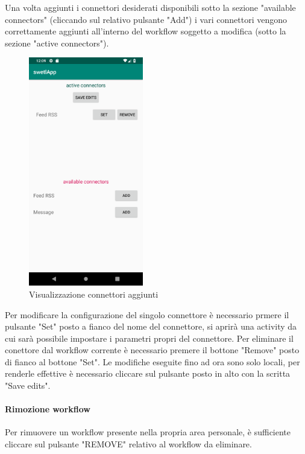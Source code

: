 Una volta aggiunti i connettori desiderati disponibili sotto la sezione "available connectors" (cliccando sul relativo pulsante "Add") i vari connettori vengono correttamente aggiunti all'interno del workflow soggetto a modifica (sotto la sezione "active connectors").
\begin{figure}[H]
	\centering
	\includegraphics[width=5cm]{../includes/pics/example_connector_added_to_workflow.png}
	\caption{\label{fig:example_connector_added_to_workflow}Visualizzazione connettori aggiunti}
\end{figure}
Per modificare la configurazione del singolo connettore è necessario prmere il pulsante "Set" posto a fianco del nome del connettore, si aprirà una activity da cui sarà possibile impostare i parametri propri del connettore.
Per eliminare il conettore dal workflow corrente è necessario premere il bottone "Remove" posto di fianco al bottone "Set".
Le modifiche eseguite fino ad ora sono solo locali, per renderle effettive è necessario cliccare sul pulsante posto in alto con la scritta "Save edits".
\paragraph{Rimozione workflow}
\label{sec:sec_rimozione_workflow}
Per rimuovere un workflow presente nella propria area personale, è sufficiente cliccare sul pulsante "REMOVE" relativo al workflow da eliminare.